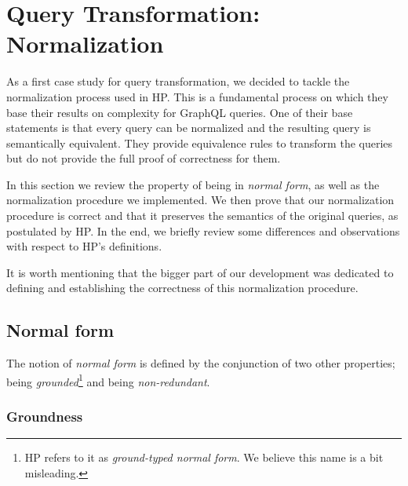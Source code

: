 
\section{Query Transformation: Normalization}\label{sec:norm}

As a first case study for query transformation, we decided to tackle the normalization process used in HP. This is a fundamental process on which they base their results on complexity for GraphQL queries. One of their base statements is that every query can be normalized and the resulting query is semantically equivalent. They provide equivalence rules to transform the queries but do not provide the full proof of correctness for them.

In this section we review the property of being in \textit{normal form}, as well as the normalization procedure we implemented. We then prove that our normalization procedure is correct and that it preserves the semantics of the original queries, as postulated by HP. In the end, we briefly review some differences and observations with respect to HP's definitions.

It is worth mentioning that the bigger part of our development was dedicated to defining and establishing the correctness of this normalization procedure.

\subsection{Normal form}

The notion of \textit{normal form} is defined by the conjunction of two other properties; being \textit{grounded}\footnote{HP refers to it as \textit{ground-typed normal form}. We believe this name is a bit misleading.} and being \textit{non-redundant}.


\subsubsection*{Groundness}

